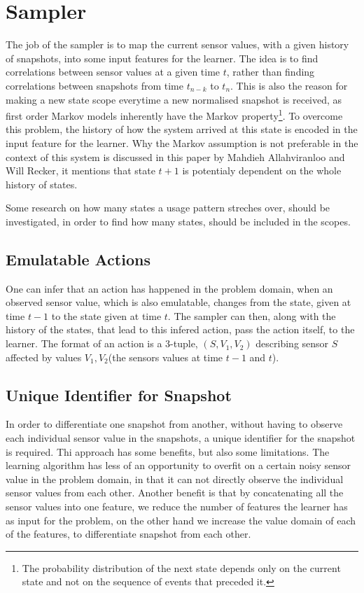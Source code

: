 \section{Sampler}\label{sec:sampler}
The job of the sampler is to map the current sensor values, with a given history of snapshots, into some input features for the learner.
The idea is to find correlations between sensor values at a given time $t$, rather than finding correlations between snapshots from time $t_{n-k}$ to $t_n$. This is also the reason for making a new state scope everytime a new normalised snapshot is received, as first order Markov models inherently have the Markov property\footnote{The probability distribution of the next state depends only on the current state and not on the sequence of events that preceded it.\cite{wiki_markov_chain}}. To overcome this problem, the history of how the system arrived at this state is encoded in the input feature for the learner. Why the Markov assumption is not preferable in the context of this system is discussed in this paper\cite{Allahviranloo201316} by Mahdieh Allahviranloo and Will Recker, it mentions that state $t+1$ is potentialy dependent on the whole history of states.

Some research on how many states a usage pattern streches over, should be investigated, in order to find how many states, should be included in the scopes.

\subsection{Emulatable Actions}
One can infer that an action has happened in the problem domain, when an observed sensor value, which is also emulatable, changes from the state, given at time $t-1$ to the state given at time $t$. The sampler can then, along with the history of the states, that lead to this infered action, pass the action itself, to the learner. The format of an action is a 3-tuple, $(S,V_1,V_2)$ describing sensor $S$ affected by values $V_1, V_2$(the sensors values at time $t-1$ and $t$).

\subsection{Unique Identifier for Snapshot}

In order to differentiate one snapshot from another, without having to observe each individual sensor value in the snapshots, a unique identifier for the snapshot is required.
Thi approach has some benefits, but also some limitations. The learning algorithm has less of an opportunity to overfit on a certain noisy sensor value in the problem domain, in that it can not directly observe the individual sensor values from each other.
Another benefit is that by concatenating all the sensor values into one feature, we reduce the number of features the learner has as input for the problem, on the other hand we increase the value domain of each of the features, to differentiate snapshot from each other.

